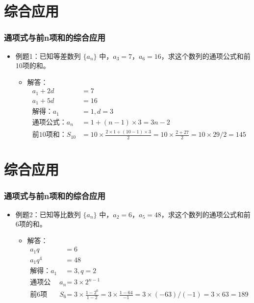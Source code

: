 \documentclass{ctexbeamer}
\begin{document}
\section{综合应用}
\begin{frame}
\frametitle{通项式与前n项和的综合应用}
\begin{itemize}
    \item 例题1：已知等差数列 $\{a_n\}$ 中，$a_3 = 7$，$a_6 = 16$，求这个数列的通项公式和前10项的和。
        \begin{itemize}
            \item 解答：
                \begin{align*}
                    a_1 + 2d &= 7 \\
                    a_1 + 5d &= 16 \\
                    \text{解得：} a_1 &= 1, d = 3 \\
                    \text{通项公式：} a_n &= 1 + (n - 1) × 3 = 3n - 2 \\
                    \text{前10项和：} S_{10} &= 10 × \frac{2 × 1 + (10 - 1) × 3}{2} = 10 × \frac{2 + 27}{2} = 10 × 29/2 = 145
                \end{align*}
        \end{itemize}
\end{itemize}
\end{frame}

\section{综合应用}
\begin{frame}
\frametitle{通项式与前n项和的综合应用}
\begin{itemize}
    \item 例题2：已知等比数列 $\{a_n\}$ 中，$a_2 = 6$，$a_5 = 48$，求这个数列的通项公式和前6项的和。
        \begin{itemize}
            \item 解答：
                \begin{align*}
                    a_1q &= 6 \\
                    a_1q^4 &= 48 \\
                    \text{解得：} a_1 &= 3, q = 2 \\
                    \text{通项公式：} a_n &= 3 × 2^{n-1} \\
                    \text{前6项和：} S_6 &= 3 × \frac{1 - 2^6}{1 - 2} = 3 × \frac{1 - 64}{-1} = 3 × (-63)/(-1) = 3 × 63 = 189
                \end{align*}
        \end{itemize}
\end{itemize}
\end{frame}
\end{document}
